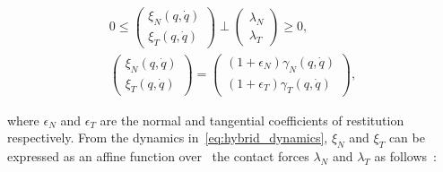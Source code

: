 \begin{equation}
  \begin{gathered}
    0 \leq 
    \begin{pmatrix}
      \xi_N(q, \dot{q}) \\
      \xi_T(q, \dot{q})
    \end{pmatrix} 
    \perp
      \begin{pmatrix}
        \lambda_N  \\
        \lambda_T
      \end{pmatrix} \geq 0, \\
    \begin{pmatrix}
      \xi_N(q, \dot{q}) \\
      \xi_T(q, \dot{q})
    \end{pmatrix} =
      \begin{pmatrix}
        (1+\epsilon_N) \gamma_N(q, \dot{q})  \\
        (1+\epsilon_T) \gamma_T(q, \dot{q})
      \end{pmatrix},
  \end{gathered}
  \label{eq:complementarity} 
\end{equation}

\noindent where $\epsilon_N$ and $\epsilon_T$ are the normal and tangential
coefficients of restitution respectively. 
% 
From the dynamics in~\eqref{eq:hybrid_dynamics}, $\xi_N$ and $\xi_T$ can be
expressed as an affine function over~ the contact forces $\lambda_N$ and
$\lambda_T$ as follows~\cite{glocker2005formulation}:

